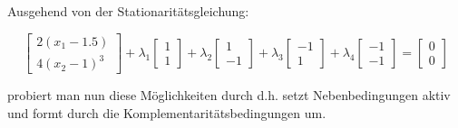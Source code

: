 \documentclass[a4paper, 12pt]{report}
\begin{document}
Ausgehend von der Stationaritätsgleichung:

$$ \begin{bmatrix}2(x_1 - 1.5)\\4(x_2 - 1)^3\end{bmatrix} + \lambda_1 \begin{bmatrix}1\\1\end{bmatrix} + \lambda_2 \begin{bmatrix}1\\-1\end{bmatrix} + \lambda_3 \begin{bmatrix}-1\\1\end{bmatrix} + \lambda_4 \begin{bmatrix}-1\\-1\end{bmatrix} = \begin{bmatrix}0\\0\end{bmatrix}$$

probiert man nun diese Möglichkeiten durch d.h. setzt Nebenbedingungen aktiv und formt durch die Komplementaritätsbedingungen um.
\end{document}

